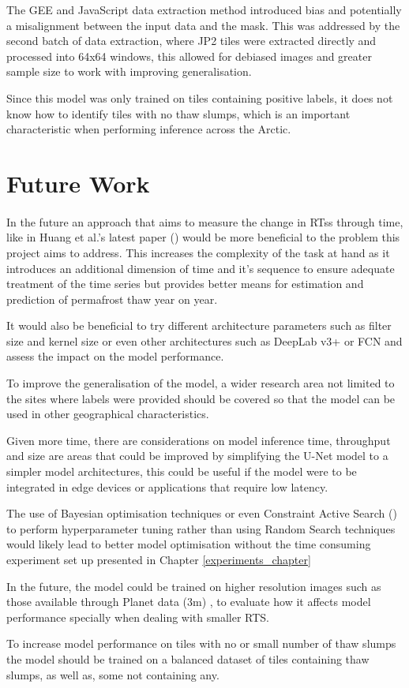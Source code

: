 The GEE and JavaScript data extraction method introduced bias and potentially a misalignment between the input data and the mask.  This was addressed by the second batch of data extraction, where JP2 tiles were extracted directly and processed into 64x64 windows, this allowed for debiased images and  greater sample size to work with improving generalisation.

Since this model was only trained on tiles containing positive labels, it does not know how to identify tiles with no thaw slumps, which is an important characteristic when performing inference across the Arctic. 
\section{Future Work}
\paragraph{}
In the future an approach that aims to measure the change in RTss through time, like in Huang et al.'s latest paper (\cite{HUANG2021102399}) would be more beneficial to the problem this project aims to address. This increases the complexity of the task at hand as it introduces an additional dimension of time and it's sequence to ensure adequate treatment of the time series but provides better means for estimation and prediction of permafrost thaw year on year.

It would also be beneficial to try different architecture parameters such as filter size and kernel size or even other architectures such as DeepLab v3+ or \gls{FCN} and assess the impact on the model performance.

To improve the generalisation of the model, a wider research area not limited to the sites where labels were provided should be covered so that the model can be used in other geographical characteristics.

Given more time, there are considerations on  model inference time, throughput and size are areas that could be improved by simplifying the U-Net model to a simpler model architectures, this could be useful if the model were to be integrated in edge devices or applications that require low latency.

The use of Bayesian optimisation techniques or even Constraint Active Search (\cite{pmlr-v139-malkomes21a}) to perform hyperparameter tuning rather than using Random Search techniques would likely lead to better model optimisation without the time consuming experiment set up presented in Chapter \ref{experiments_chapter}

In the future, the model could be trained on higher resolution images such as those available through Planet data (3m) , to evaluate how it affects model performance specially when dealing with smaller RTS.

To increase model performance on tiles with no or small number of thaw slumps the model should be trained on a balanced dataset of tiles containing thaw slumps, as well as, some not containing any.
